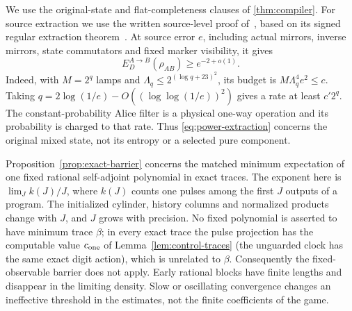 We use the original-state and flat-completeness clauses of \cref{thm:compiler}. For source extraction we use the written source-level proof of~\cite[Theorem~12.4]{DM-precision}, based on its signed regular extraction theorem~\cite[Theorem~6.4]{DM-precision}. At source error $e$, including actual mirrors, inverse mirrors, state commutators and fixed marker visibility, it gives
\begin{equation}\label{eq:power-extraction}
 E_D^{A\to B}(\rho_{AB})\ge e^{-2+o(1)}.
\end{equation}
Indeed, with $M=2^q$ lamps and $\Lambda_q\le2^{(\log q+23)^2}$, its budget is $M\Lambda_q^4e^2\le c$. Taking
$q=2\log(1/e)-O((\log\log(1/e))^2)$ gives a rate at least $c'2^q$. The constant-probability Alice filter is a physical one-way operation and its probability is charged to that rate. Thus \eqref{eq:power-extraction} concerns the original mixed state, not its entropy or a selected pure component.

\begin{remark}\label{rem:power-trace-barrier}
Proposition~\ref{prop:exact-barrier} concerns the matched minimum expectation of one fixed rational self-adjoint polynomial in exact traces. The exponent here is $\lim_J k(J)/J$, where $k(J)$ counts one pulses among the first $J$ outputs of a program. The initialized cylinder, history columns and normalized products change with $J$, and $J$ grows with precision. No fixed polynomial is asserted to have minimum trace $\beta$; in every exact trace the pulse projection has the computable value $c_{\rm one}$ of Lemma~\ref{lem:control-traces} (the unguarded clock has the same exact digit action), which is unrelated to $\beta$. Consequently the fixed-observable barrier does not apply. Early rational blocks have finite lengths and disappear in the limiting density. Slow or oscillating convergence changes an ineffective threshold in the estimates, not the finite coefficients of the game.
\end{remark}
